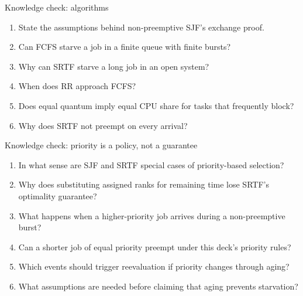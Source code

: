 \documentclass[aspectratio=169,11pt]{beamer}
\begin{document}
\begin{frame}{Knowledge check: algorithms}
  \begin{enumerate}
    \item State the assumptions behind non-preemptive SJF's exchange proof.
    \item Can FCFS starve a job in a finite queue with finite bursts?
    \item Why can SRTF starve a long job in an open system?
    \item When does RR approach FCFS?
    \item Does equal quantum imply equal CPU share for tasks that frequently block?
    \item Why does SRTF not preempt on every arrival?
  \end{enumerate}
\end{frame}

\begin{frame}{Knowledge check: priority is a policy, not a guarantee}
  \begin{enumerate}
    \item In what sense are SJF and SRTF special cases of priority-based selection?
    \item Why does substituting assigned ranks for remaining time lose SRTF's optimality guarantee?
    \item What happens when a higher-priority job arrives during a non-preemptive burst?
    \item Can a shorter job of equal priority preempt under this deck's priority rules?
    \item Which events should trigger reevaluation if priority changes through aging?
    \item What assumptions are needed before claiming that aging prevents starvation?
  \end{enumerate}
\end{frame}
\end{document}
